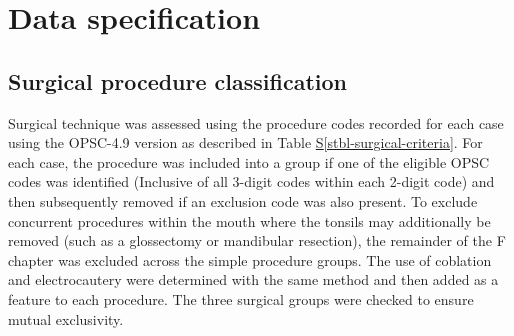 \documentclass[
  letterpaper,
  DIV=11,
  numbers=noendperiod]{scrreprt}
\newcounter{none} %
\newcommand*\quartostblref[1]{Table \hyperref[#1]{S\ref{#1}}}
\begin{document}
\section{Data specification}\label{sec-sm-data-spec}

\subsection{Surgical procedure
classification}\label{sec-sm-data-spec-procedures}

Surgical technique was assessed using the procedure codes recorded for
each case using the OPSC-4.9 version as described in
\quartostblref{stbl-surgical-criteria}. For each case, the procedure was
included into a group if one of the eligible OPSC codes was identified
(Inclusive of all 3-digit codes within each 2-digit code) and then
subsequently removed if an exclusion code was also present. To exclude
concurrent procedures within the mouth where the tonsils may
additionally be removed (such as a glossectomy or mandibular resection),
the remainder of the F chapter was excluded across the simple procedure
groups. The use of coblation and electrocautery were determined with the
same method and then added as a feature to each procedure. The three
surgical groups were checked to ensure mutual exclusivity.

\begin{stbl}


\caption{\label{stbl-surgical-criteria}\textbf{Criteria for surgical
cohort eligibility.}}

\end{stbl}%
\end{document}
